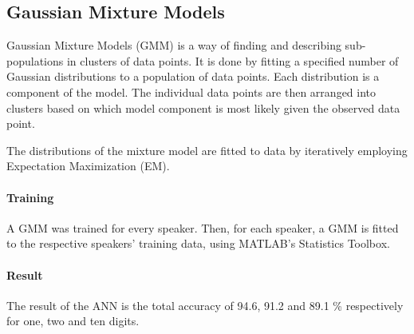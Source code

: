 \subsection*{Gaussian Mixture Models}
Gaussian Mixture Models (GMM) is a way of finding and describing sub-populations in clusters of data points.
It is done by fitting a specified number of Gaussian distributions to a population of data points.
Each distribution is a component of the model. 
The individual data points are then arranged into clusters based on which model component is most likely given the observed data point.

The distributions of the mixture model are fitted to data by iteratively employing Expectation Maximization (EM).

\paragraph*{Training}
A GMM was trained for every speaker.
Then, for each speaker, a GMM is fitted to the respective speakers' training data, using MATLAB's Statistics Toolbox.

\paragraph*{Result}
The result of the ANN is the total accuracy of 94.6, 91.2 and 89.1 \% respectively for one, two and ten digits. 